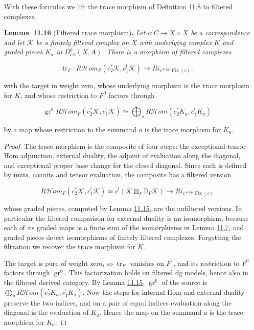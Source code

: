 \documentclass[11pt]{article}
\newenvironment{bpstatement}[2]{\par\addvspace{0.6\baselineskip}\noindent\textbf{#1}#2\textbf{.}\enspace\ignorespaces}
  {\par\addvspace{0.4\baselineskip}}
\newenvironment{bpstatementit}[2]{\begin{bpstatement}{#1}{#2}\itshape\ignorespaces}{\end{bpstatement}}
\providecommand{\Fix}{}\renewcommand{\Fix}{\operatorname{Fix}}
\providecommand{\cHom}{}\renewcommand{\cHom}{R\mathcal{H}\!om}
\begin{document}
\label{bp44}%
With these formulas we lift the trace morphism of Definition \hyperref[bp25]{11.8} to filtered complexes.

\label{bp45}%
\begin{bpstatementit}{Lemma~11.16}{ (Filtered trace morphism)}
Let \(c:C\to X\times X\) be a correspondence and let \(\mathcal K\) be a finitely filtered complex on \(X\) with underlying complex \(K\) and graded pieces \(K_a\) in \(D^b_{\mathrm{ctf}}(X,A)\). There is a morphism of filtered complexes

\[
\operatorname{tr}_F:
\cHom_F(c_2^*\mathcal K,c_1^!\mathcal K)\longrightarrow
Ri_{c*}\omega_{\Fix(c)},
\]

with the target in weight zero, whose underlying morphism is the trace morphism for \(K\), and whose restriction to \(F^0\) factors through

\[
\operatorname{gr}^0\cHom_F(c_2^*\mathcal K,c_1^!\mathcal K)
\simeq\bigoplus_a\cHom(c_2^*K_a,c_1^!K_a)
\]

by a map whose restriction to the summand \(a\) is the trace morphism for \(K_a\).
\end{bpstatementit}

\begin{proof}[{Proof}]\label{bp46}%
The trace morphism is the composite of four steps: the exceptional tensor–Hom adjunction, external duality, the adjoint of evaluation along the diagonal, and exceptional proper base change for the closed diagonal. Since each is defined by units, counits and tensor evaluation, the composite has a filtered version

\[
\cHom_F(c_2^*\mathcal K,c_1^!\mathcal K)
\simeq c^!(\mathcal K\boxtimes_F\mathbb D_F\mathcal K)
\longrightarrow Ri_{c*}\omega_{\Fix(c)}
\]

whose graded pieces, computed by Lemma \hyperref[bp42]{11.15}, are the unfiltered versions. In particular the filtered comparison for external duality is an isomorphism, because each of its graded maps is a finite sum of the isomorphisms in Lemma \hyperref[bp22]{11.7}, and graded pieces detect isomorphisms of finitely filtered complexes. Forgetting the filtration we recover the trace morphism for \(K\).

The target is pure of weight zero, so \(\operatorname{tr}_F\) vanishes on \(F^1\), and its restriction to \(F^0\) factors through \(\operatorname{gr}^0\). This factorization holds on filtered dg models, hence also in the filtered derived category. By Lemma \hyperref[bp42]{11.15}, \(\operatorname{gr}^0\) of the source is \(\bigoplus_a\cHom(c_2^*K_a,c_1^!K_a)\). Now the steps for internal Hom and external duality preserve the two indices, and on a pair of equal indices evaluation along the diagonal is the evaluation of \(K_a\). Hence the map on the summand \(a\) is the trace morphism for \(K_a\).
\end{proof}
\end{document}
